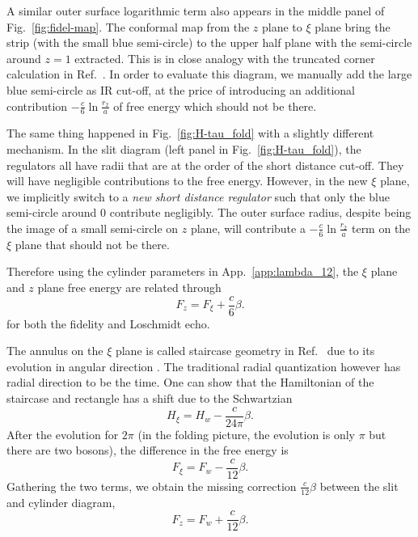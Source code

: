 A similar outer surface logarithmic term also appears in the middle panel of Fig.~\ref{fig:fidel-map}. The conformal map from the $z$ plane to $\xi$ plane bring the strip (with the small blue semi-circle) to the upper half plane with the semi-circle around $z = 1$ extracted. This is in close analogy with the truncated corner calculation in Ref.~. In order to evaluate this diagram, we manually add the large blue semi-circle as IR cut-off, at the price of introducing an additional contribution  $-\frac{c}{6} \ln \frac{r_2}{a}$ of free energy which should not be there. 

The same thing happened in Fig.~\ref{fig:H-tau_fold} with a slightly different mechanism. In the slit diagram (left panel in Fig.~\ref{fig:H-tau_fold}), the regulators all have radii that are at the order of the short distance cut-off. They will have negligible contributions to the free energy. However, in the new $\xi$ plane, we implicitly switch to a {\it new short distance regulator} such that only the blue semi-circle around $0$ contribute negligibly. The outer surface radius, despite being the image of a small semi-circle on $z$ plane, will contribute a $-\frac{c}{6} \ln \frac{r_2}{a}$ term on the $\xi$ plane that should not be there. 

Therefore using the cylinder parameters in App.~\ref{app:lambda_12}, the $\xi$ plane and $z$ plane free energy are related through
\begin{equation}
F_{z} = F_{\xi} + \frac{c}{6} \beta .
\end{equation}
for both the fidelity and Loschmidt echo. 

The annulus on the $\xi$ plane is called staircase geometry in Ref.~ due to its evolution in angular direction . The traditional radial quantization however has radial direction to be the time. One can show that the Hamiltonian of the staircase and rectangle has a shift due to the Schwartzian\cite{cardy_finite-size_1988}
\begin{equation}
H_{\xi} = H_{w} - \frac{c}{24\pi} \beta .
\end{equation}
After the evolution for $2\pi$ (in the folding picture, the evolution is only $\pi$ but there are two bosons), the difference in the free energy is
\begin{equation}
F_{\xi} = F_{w} - \frac{c}{12} \beta .
\end{equation}
Gathering the two terms, we obtain the missing correction $\frac{c}{12} \beta$ between the slit and cylinder diagram, 
\begin{equation}
F_{z} = F_w + \frac{c}{12}\beta.
\end{equation}


